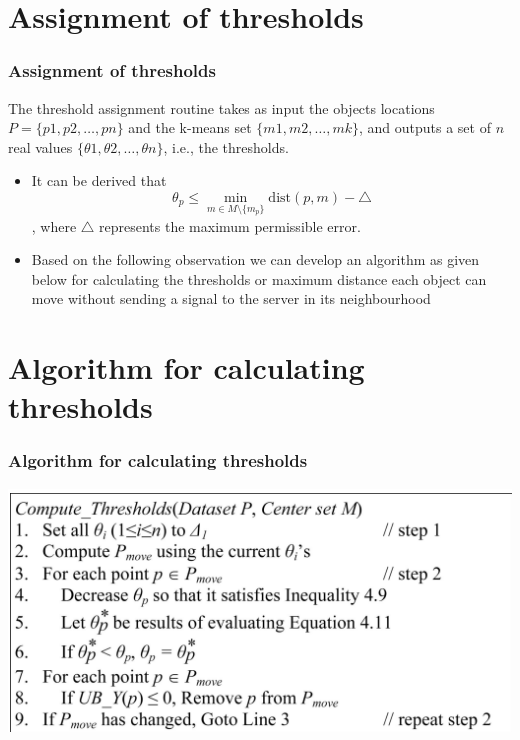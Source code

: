 \documentclass{beamer}
\begin{document}
\section{Assignment of thresholds}
\begin{frame}
\frametitle{Assignment of thresholds}
The threshold assignment routine takes as input the
objects locations \(P = \{p1, p2, \ldots, pn\}\) and the k-means set
\(\{m1, m2, \ldots, mk\}\), and outputs a set of \(n\) real values \(\{\theta 1, \theta 2, \ldots, \theta n\}\), i.e., the thresholds.
\begin{itemize}
    \item It can be derived that \[ \theta_p \leq \min_{m \in M \setminus \{m_p\}} \text{dist}(p, m) - \triangle \], where $\triangle$ represents the maximum permissible error.
    \vspace{5mm}
    \item  Based on the following observation we can develop an algorithm as given below for calculating the thresholds or maximum distance each object can move without sending a signal to the server in its neighbourhood
\end{itemize}


\end{frame}


\section{Algorithm for calculating thresholds}
\begin{frame}
\frametitle{Algorithm for calculating thresholds}


    \begin{center}
        \includegraphics[width=\textwidth]{algo.png} %
        
    \end{center}
\end{frame}
\end{document}
